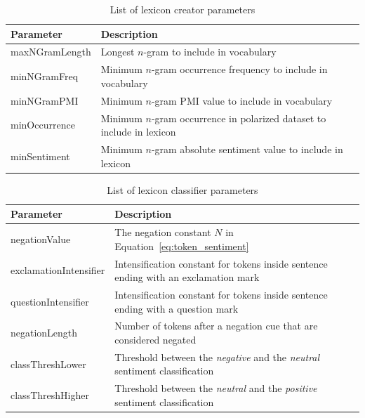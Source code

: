 \begin{table}[t]
    \setlength\tabcolsep{2pt}
    \begin{tabular}{| l | p{9cm} |}
        \hline
        \textbf{Parameter} & \textbf{Description} \\ \hline
        maxNGramLength & Longest $n$-gram to include in vocabulary \\ \hline
        minNGramFreq & Minimum $n$-gram occurrence frequency to include in vocabulary \\ \hline
        minNGramPMI & Minimum $n$-gram PMI value to include in vocabulary \\ \hline
        minOccurrence & Minimum $n$-gram occurrence in polarized dataset to include in lexicon \\ \hline
        minSentiment & Minimum $n$-gram absolute sentiment value to include in lexicon \\ \hline
    \end{tabular}
    \caption{List of lexicon creator parameters}
    \label{tab:lexicon_creator_parameters}
\end{table}

\begin{table}[t]
    \setlength\tabcolsep{2pt}
    \begin{tabular}{| l | p{9cm} |}
        \hline
        \textbf{Parameter} & \textbf{Description} \\ \hline
        negationValue & The negation constant $N$ in Equation~\ref{eq:token_sentiment} \\ \hline
        exclamationIntensifier & Intensification constant for tokens inside sentence ending with an exclamation mark \\ \hline
        questionIntensifier & Intensification constant for tokens inside sentence ending with a question mark \\ \hline
        negationLength & Number of tokens after a negation cue that are considered negated \\ \hline
        classThreshLower & Threshold between the \textit{negative} and the \textit{neutral} sentiment classification \\ \hline
        classThreshHigher & Threshold between the \textit{neutral} and the \textit{positive} sentiment classification \\ \hline
    \end{tabular}
    \caption{List of lexicon classifier parameters}
    \label{tab:lexicon_classifier_parameters}
\end{table}

